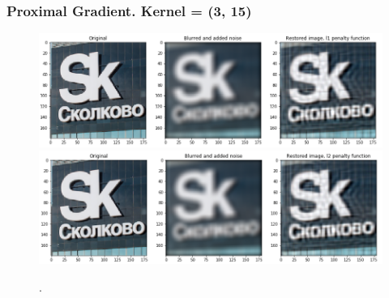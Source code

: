 \documentclass[hyperref={pdfpagelabels=false}]{beamer}
\begin{document}
\begin{frame}
\frametitle{Proximal Gradient. Kernel = (3, 15)}
\begin{center}
\begin{figure}[h]
\begin{adjustwidth}{-0.2cm}{-0.5 cm}
\includegraphics[scale=0.355]{l1_all_imgs_3_15.png} \\
\includegraphics[scale=0.355]{l2_all_imgs_3_15.png} \\
\end{adjustwidth}
\caption{.}
\end{figure}
\end{center}

\end{frame}
\end{document}
